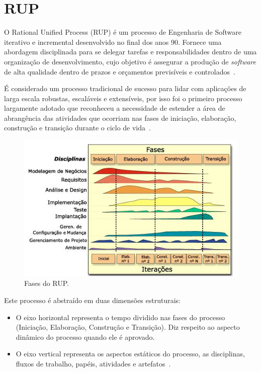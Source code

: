   \section{RUP}
O Rational Unified Process (RUP) é um processo de Engenharia de Software iterativo e incremental desenvolvido no final dos anos 90. Fornece uma abordagem disciplinada para se delegar tarefas e responsabilidades dentro de uma organização de desenvolvimento, cujo objetivo é assegurar a produção de \textit{software} de alta qualidade dentro de prazos e orçamentos previsíveis e controlados~\cite{kruchten}.

É considerado um processo tradicional de sucesso para lidar com aplicações de larga escala robustas, escaláveis e extensíveis, por isso foi o primeiro processo largamente adotado que reconheceu a necessidade de estender a área de abrangência das atividades que ocorriam nas fases de iniciação, elaboração, construção e transição durante o ciclo de vida~\cite{deanleffingwell}.

    \begin{figure}[!htbp]
    \centering
    \includegraphics[scale=3.0]{figuras/Fases_do_RUP_-_portugues}
    \caption[Fases do RUP]{Fases do RUP. \footnotemark}
    \label{fases-rup}
  \end{figure}
Este processo é abstraído em duas dimensões estruturais:
\begin{itemize}
\item O eixo horizontal representa o tempo dividido nas fases do processo 	(Iniciação, Elaboração, Construção e Transição). Diz 	respeito ao aspecto dinâmico do processo quando ele é aprovado.
\item O eixo vertical representa os aspectos estáticos do processo, as 	disciplinas, fluxos de trabalho, papéis, atividades e artefatos~\cite{rup2}.
\end{itemize}

